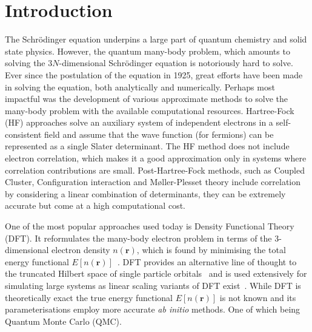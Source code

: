 \documentclass[final,3p,times,twocolumn]{elsarticle}
\begin{document}
	
	\tableofcontents
	
	\section{Introduction}
	\label{sec:intro}
	The Schr{\"o}dinger equation underpins a large part of quantum chemistry and solid state physics. However, the quantum many-body problem, which amounts to solving the $3N$-dimensional Schr\"odinger equation is notoriously hard to solve. Ever since the postulation of the equation in 1925, great efforts have been made in solving the equation, both analytically and numerically. Perhaps most impactful was the development of various approximate methods to solve the many-body problem with the available computational resources. Hartree-Fock (HF) approaches solve an auxiliary system of independent electrons in a self-consistent field and assume that the wave function (for fermions) can be represented as a single Slater determinant. The HF method does not include electron correlation, which makes it a good approximation only in systems where correlation contributions are small. Post-Hartree-Fock methods, such as Coupled Cluster, Configuration interaction and M\o ller-Plesset theory include correlation by considering a linear combination of determinants, they can be extremely accurate but come at a high computational cost. 

	One of the most popular approaches used today is Density Functional Theory (DFT). It reformulates the many-body electron problem in terms of the $3$-dimensional electron density $n(\mathbf{r})$, which is found by minimising the total energy functional $E[n(\mathbf{r})]$~\cite{hohenberg1964inhomogeneous}. DFT provides an alternative line of thought to the truncated Hilbert space of single particle orbitals~\cite{kohn1999nobel} and is used extensively for simulating large systems as linear scaling variants of DFT exist~\cite{skylaris2005introducing}. 
	While DFT is theoretically exact the true energy functional $E[n(\mathbf{r})]$ is not known and its parameterisations employ more accurate \emph{ab initio} methods. One of which being Quantum Monte Carlo (QMC).
	
\end{document}
